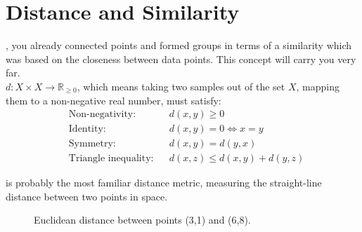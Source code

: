 
\newpage


\section{Distance and Similarity}


, you already connected points and formed groups in terms of a similarity which was 
based on the closeness between data points. This concept will carry you very far.\\

 $d: X \times X \to \mathbb{R}_{\geq 0}$, which means taking two samples out of the set $X$,
mapping them to a non-negative real number, must satisfy:
\begin{align}
    &\text{Non-negativity:} && d(x, y) \geq 0 \label{eq:nonnegativity} \\
    &\text{Identity:}       && d(x, y) = 0 \iff x = y \label{eq:identity} \\
    &\text{Symmetry:}       && d(x, y) = d(y, x) \label{eq:symmetry} \\
    &\text{Triangle inequality:} && d(x, z) \leq d(x, y) + d(y, z) \label{eq:triangle}
\end{align}

 is probably the most familiar distance metric, measuring the straight-line distance between two points in space.


\begin{figure}
\centering
{}
\caption{Euclidean distance between points (3,1) and (6,8).}
\label{fig:six_points_euclidean}
\end{figure}


